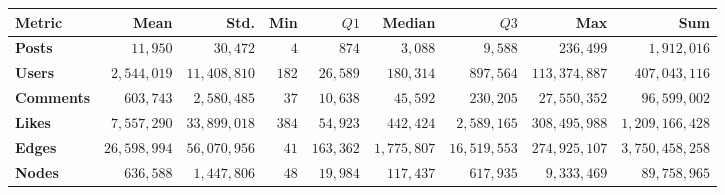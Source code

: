 \begin{tabular}{lrrrrrrrr}
\toprule
\textbf{Metric} &         Mean &         Std. &   Min &      $Q1$ &      Median &         $Q3$ &           Max &             Sum \\
\midrule
\textbf{Posts   } &     $11,950$ &     $30,472$ &   $4$ &     $874$ &     $3,088$ &      $9,588$ &     $236,499$ &     $1,912,016$ \\
\textbf{Users   } &  $2,544,019$ & $11,408,810$ & $182$ &  $26,589$ &   $180,314$ &    $897,564$ & $113,374,887$ &   $407,043,116$ \\
\textbf{Comments} &    $603,743$ &  $2,580,485$ &  $37$ &  $10,638$ &    $45,592$ &    $230,205$ &  $27,550,352$ &    $96,599,002$ \\
\textbf{Likes   } &  $7,557,290$ & $33,899,018$ & $384$ &  $54,923$ &   $442,424$ &  $2,589,165$ & $308,495,988$ & $1,209,166,428$ \\
\textbf{Edges   } & $26,598,994$ & $56,070,956$ &  $41$ & $163,362$ & $1,775,807$ & $16,519,553$ & $274,925,107$ & $3,750,458,258$ \\
\textbf{Nodes   } &    $636,588$ &  $1,447,806$ &  $48$ &  $19,984$ &   $117,437$ &    $617,935$ &   $9,333,469$ &    $89,758,965$ \\
\bottomrule
\end{tabular}
